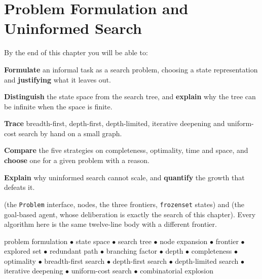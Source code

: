 \chapter{Problem Formulation and Uninformed Search}\label{ch:uninformed}

\begin{outcomes}
By the end of this chapter you will be able to:
\begin{tight}
  \item \textbf{Formulate} an informal task as a search problem, choosing a state
        representation and \textbf{justifying} what it leaves out.
  \item \textbf{Distinguish} the state space from the search tree, and
        \textbf{explain} why the tree can be infinite when the space is finite.
  \item \textbf{Trace} breadth-first, depth-first, depth-limited, iterative
        deepening and uniform-cost search by hand on a small graph.
  \item \textbf{Compare} the five strategies on completeness, optimality, time and
        space, and \textbf{choose} one for a given problem with a reason.
  \item \textbf{Explain} why uninformed search cannot scale, and \textbf{quantify}
        the growth that defeats it.
\end{tight}
\end{outcomes}

\begin{prereq}
 (the \texttt{Problem} interface, nodes, the three frontiers,
\texttt{frozenset} states) and  (the goal-based agent, whose
deliberation is exactly the search of this chapter). Every algorithm here is the
same twelve-line body with a different frontier.
\end{prereq}

\begin{keyterms}
problem formulation $\bullet$ state space $\bullet$ search tree $\bullet$ node
expansion $\bullet$ frontier $\bullet$ explored set $\bullet$ redundant path
$\bullet$ branching factor $\bullet$ depth $\bullet$ completeness $\bullet$
optimality $\bullet$ breadth-first search $\bullet$ depth-first search $\bullet$
depth-limited search $\bullet$ iterative deepening $\bullet$ uniform-cost search
$\bullet$ combinatorial explosion
\end{keyterms}


